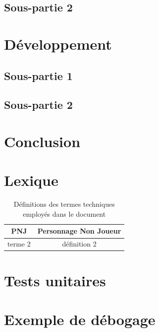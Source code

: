 \documentclass[a4paper,12pt]{article}
\begin{document}
\subsection{Sous-partie 2}



\section{Développement}

\subsection{Sous-partie 1}

\subsection{Sous-partie 2}



\section{Conclusion}



\newpage
\appendix

\section{Lexique}

\begin{table}[h]
    \centering
    \begin{tabular}{c c}
	\toprule
	PNJ		& Personnage Non Joueur \\
	\midrule
	terme 2		& définition 2 \\
	\bottomrule
    \end{tabular}
    \caption{Définitions des termes techniques employés dans le document}
\end{table}



\section{Tests unitaires}
\section{Exemple de débogage}

\end{document}

